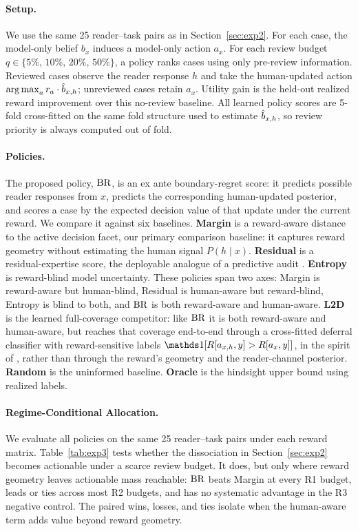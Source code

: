 \paragraph{Setup.}
We use the same 25 reader--task pairs as in Section~\ref{sec:exp2}.
For each case, the model-only belief $b_x$ induces a model-only action $a_x$.
For each review budget $q\in\{5\%,\,10\%,\,20\%,\,50\%\}$, a policy ranks cases using only pre-review information.
Reviewed cases observe the reader response $h$ and take the human-updated action $\operatorname*{arg\,max}_a r_a\cdot\hat{b}_{x,h}$; unreviewed cases retain $a_x$.
Utility gain is the held-out realized reward improvement over this no-review baseline.
All learned policy scores are 5-fold cross-fitted on the same fold structure used to estimate $\hat{b}_{x,h}$, so review priority is always computed out of fold.

\paragraph{Policies.}
The proposed policy, $\operatorname{BR}$, is an ex ante boundary-regret score: it predicts possible reader responses from $x$, predicts the corresponding human-updated posterior, and scores a case by the expected decision value of that update under the current reward.
We compare it against six baselines.
\textbf{Margin} is a reward-aware distance to the active decision facet, our primary comparison baseline: it captures reward geometry without estimating the human signal $P(h\mid x)$.
\textbf{Residual} is a residual-expertise score, the deployable analogue of a predictive audit \citep{AlurEtAl2023}.
\textbf{Entropy} is reward-blind model uncertainty.
These policies span two axes: Margin is reward-aware but human-blind, Residual is human-aware but reward-blind, Entropy is blind to both, and $\operatorname{BR}$ is both reward-aware and human-aware.
\textbf{L2D} is the learned full-coverage competitor: like $\operatorname{BR}$ it is both reward-aware and human-aware, but reaches that coverage end-to-end through a cross-fitted deferral classifier with reward-sensitive labels $\Ind[R[a_{x,h},y]>R[a_x,y]]$, in the spirit of \citep{MozannarSontag2020,MaoMohri2023}, rather than through the reward's geometry and the reader-channel posterior.
\textbf{Random} is the uninformed baseline.
\textbf{Oracle} is the hindsight upper bound using realized labels.

\paragraph{Regime-Conditional Allocation.}
We evaluate all policies on the same 25 reader--task pairs under each reward matrix.
Table~\ref{tab:exp3} tests whether the dissociation in Section~\ref{sec:exp2} becomes actionable under a scarce review budget.
It does, but only where reward geometry leaves actionable mass reachable: $\operatorname{BR}$ beats Margin at every R1 budget, leads or ties across most R2 budgets, and has no systematic advantage in the R3 negative control.
The paired wins, losses, and ties isolate when the human-aware term adds value beyond reward geometry.

